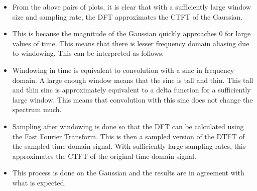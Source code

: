\documentclass{article}
\begin{document}
\begin{itemize}
\item
  From the above pairs of plots, it is clear that with a sufficiently
  large window size and sampling rate, the DFT approximates the CTFT of
  the Gaussian.
\item
  This is because the magnitude of the Gaussian quickly approaches \(0\)
  for large values of time. This means that there is lesser frequency
  domain aliasing due to windowing. This can be interpreted as follows:
\item
  Windowing in time is equivalent to convolution with a sinc in
  frequency domain. A large enough window means that the sinc is tall
  and thin. This tall and thin sinc is approximately equivalent to a
  delta function for a sufficiently large window. This means that
  convolution with this sinc does not change the spectrum much.
\item
  Sampling after windowing is done so that the DFT can be calculated
  using the Fast Fourier Transform. This is then a sampled version of
  the DTFT of the sampled time domain signal. With sufficiently large
  sampling rates, this approximates the CTFT of the original time domain
  signal.
\item
  This process is done on the Gaussian and the results are in agreement
  with what is expected.
\end{itemize}
\end{document}
